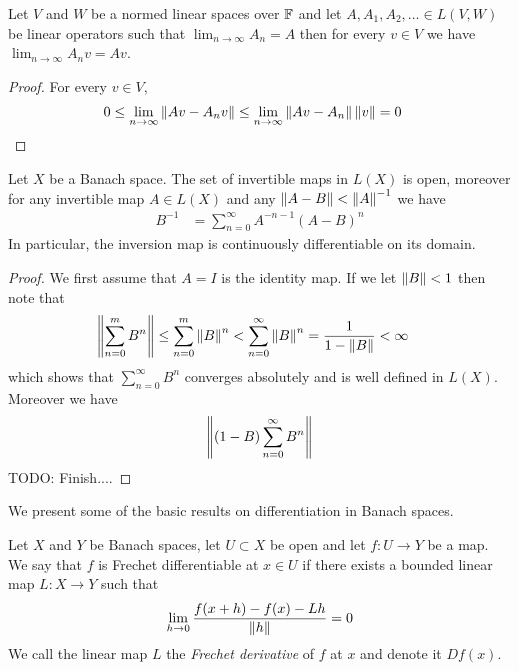 \begin{prop}\label{banach:OperatorNormConvergenceImpliesPointwise}Let
  $V$ and $W$ be a normed linear spaces over $\mathbb{F}$ and let $A, A_1, A_2, \dotsc \in L(V,W)$ be linear operators such that $\lim_{n \to \infty} A_n = A$ then for every $v \in V$ we have $\lim_{n \to \infty} A_n v = A v$.
\end{prop}
\begin{proof}
For every $v \in V$,
\begin{align*}
0 &\leq \lim_{n \to \infty} \left \lVert Av - A_n v \right \rVert  \leq  \lim_{n \to \infty} \left \lVert Av - A_n \right \rVert  \left \lVert v \right \rVert = 0
\end{align*}
\end{proof}


\begin{prop}\label{banach:InvertibleMapsOpen}Let $X$ be a Banach space.  The set of invertible maps in $L(X)$ is open, moreover
  for any invertible map $A \in L(X)$ and any $\left \lVert A-B \right \rVert <
  \left \lVert A \right \rVert^{-1}$ we have 
\begin{align*}
B^{-1} &= \sum_{n=0}^\infty A^{-n-1} (A-B)^n 
\end{align*}
In particular, the inversion map is continuously differentiable on its domain.
\end{prop}
\begin{proof}
We first assume that $A= I$ is the identity map.  If we let $\left \lVert B \right \rVert
< 1$ then note that 
\begin{align*}
\left \lVert \sum_{n=0}^m B^n \right \rVert &\leq \sum_{n=0}^m \left \lVert  B \right \rVert^n <
                          \sum_{n=0}^\infty \left \lVert  B \right \rVert^n =
                          \frac{1}{1-\left \lVert B \right \rVert} < \infty
\end{align*}
which shows that $\sum_{n=0}^\infty B^n$ converges absolutely and
is well defined in $L(X)$.  Moreover we have
\begin{align*}
\left \lVert (1- B) \sum_{n=0}^\infty B^n  \right \rVert
\end{align*}
TODO: Finish....
\end{proof}

We present some of the basic results on differentiation in Banach
spaces.

\begin{defn}Let $X$ and $Y$ be Banach spaces, let $U \subset X$ be
  open and let $f : U \to Y$ be
  a map.  We say that $f$ is Frechet differentiable at $x \in U$ if there
  exists a bounded linear map $L : X \to Y$ such that
\begin{align*}
\lim_{h \to 0} \frac{f(x + h) - f(x) -Lh}{\left \lVert h \right \rVert} = 0
\end{align*}
We call the linear map $L$ the \emph{Frechet derivative} of $f$ at $x$
and denote it $Df(x)$.
\end{defn}

